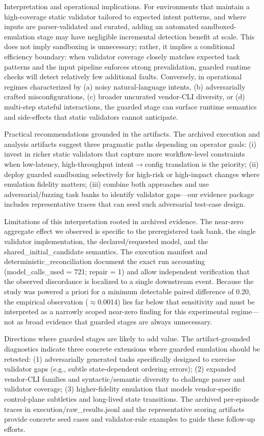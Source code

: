 \documentclass[conference]{IEEEtran}
\begin{document}
Interpretation and operational implications. For environments that maintain a high-coverage static validator tailored to expected intent patterns, and where inputs are parser-validated and curated, adding an automated sandboxed-emulation stage may have negligible incremental detection benefit at scale. This does not imply sandboxing is unnecessary; rather, it implies a conditional efficiency boundary: when validator coverage closely matches expected task patterns and the input pipeline enforces strong prevalidation, guarded runtime checks will detect relatively few additional faults. Conversely, in operational regimes characterized by (a) noisy natural-language intents, (b) adversarially crafted misconfigurations, (c) broader uncurated vendor-CLI diversity, or (d) multi-step stateful interactions, the guarded stage can surface runtime semantics and side-effects that static validators cannot anticipate.

Practical recommendations grounded in the artifacts. The archived execution and analysis artifacts suggest three pragmatic paths depending on operator goals: (i) invest in richer static validators that capture more workflow-level constraints when low-latency, high-throughput intent\ensuremath{\rightarrow}config translation is the priority; (ii) deploy guarded sandboxing selectively for high-risk or high-impact changes where emulation fidelity matters; (iii) combine both approaches and use adversarial/fuzzing task banks to identify validator gaps---our evidence package includes representative traces that can seed such adversarial test-case design.

Limitations of this interpretation rooted in archived evidence. The near-zero aggregate effect we observed is specific to the preregistered task bank, the single validator implementation, the declared/requested model, and the shared\_initial\_candidate semantics. The execution manifest and deterministic\_reconciliation document the exact run accounting (model\_calls\_used = 721; repair = 1) and allow independent verification that the observed discordance is localized to a single downstream event. Because the study was powered a priori for a minimum detectable paired difference of 0.20, the empirical observation (\ensuremath{\approx}0.0014) lies far below that sensitivity and must be interpreted as a narrowly scoped near-zero finding for this experimental regime---not as broad evidence that guarded stages are always unnecessary.

Directions where guarded stages are likely to add value. The artifact-grounded diagnostics indicate three concrete extensions where guarded emulation should be retested: (1) adversarially generated tasks specifically designed to exercise validator gaps (e.g., subtle state-dependent ordering errors); (2) expanded vendor-CLI families and syntactic/semantic diversity to challenge parser and validator coverage; (3) higher-fidelity emulation that models vendor-specific control-plane subtleties and long-lived state transitions. The archived per-episode traces in execution/raw\_results.jsonl and the representative scoring artifacts provide concrete seed cases and validator-rule examples to guide these follow-up efforts.
\end{document}
